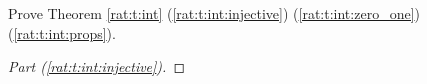 






\Newpage
\begin{exercise} %
	Prove Theorem \ref{rat:t:int} (\ref{rat:t:int:injective}) (\ref{rat:t:int:zero_one}) (\ref{rat:t:int:props}).
\end{exercise}

\begin{proof}[Part (\ref{rat:t:int:injective})]
	\TODO
\end{proof}



